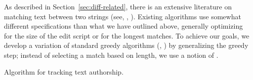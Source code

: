 As described in Section~\ref{sec:diff-related}, there is an extensive
literature on matching text between two strings (see, \eg,
\cite{Hunt1976,Hirschberg1977,Tichy1984,Myers1986,Burns1997}).
Existing algorithms use somewhat different specifications than what
we have outlined above, generally optimizing for the size of the edit
script or for the longest matches.
To achieve our goals, we develop a variation of
standard greedy algorithms (\eg, \cite{Hirschberg1977,Myers1986,Burns1997})
by generalizing the greedy step; instead of selecting a match
based on length, we use a notion of .


\begin{algorithm}
{}
\caption{Algorithm for tracking text authorship.}
\end{algorithm}


